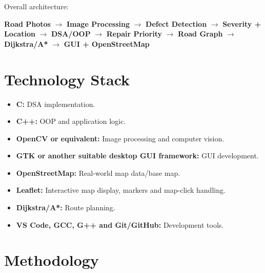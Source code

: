 \documentclass[12pt,a4paper]{article}
\begin{document}
Overall architecture:

\begin{center}
\textbf{Road Photos}
$\rightarrow$
\textbf{Image Processing}
$\rightarrow$
\textbf{Defect Detection}
$\rightarrow$
\textbf{Severity + Location}
$\rightarrow$
\textbf{DSA/OOP}
$\rightarrow$
\textbf{Repair Priority}
$\rightarrow$
\textbf{Road Graph}
$\rightarrow$
\textbf{Dijkstra/A*}
$\rightarrow$
\textbf{GUI + OpenStreetMap}
\end{center}

\section{Technology Stack}

\begin{itemize}[leftmargin=*]
    \item \textbf{C:} DSA implementation.
    \item \textbf{C++:} OOP and application logic.
    \item \textbf{OpenCV or equivalent:} Image processing and computer vision.
    \item \textbf{GTK or another suitable desktop GUI framework:} GUI development.
    \item \textbf{OpenStreetMap:} Real-world map data/base map.
    \item \textbf{Leaflet:} Interactive map display, markers and map-click handling.
    \item \textbf{Dijkstra/A*:} Route planning.
    \item \textbf{VS Code, GCC, G++ and Git/GitHub:} Development tools.
\end{itemize}

\section{Methodology}
\end{document}
